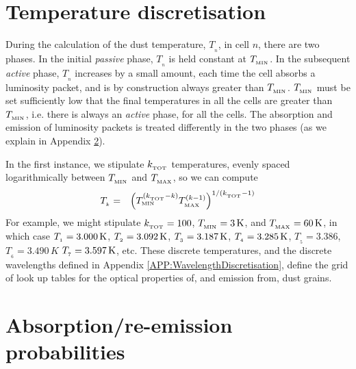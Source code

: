 \documentclass[usenatbib]{mn2e}
\numberwithin{equation}{section}
\begin{document}
\section{Temperature discretisation}

During the calculation of the dust temperature, $T_{_n}$, in cell $n$, there are two phases. In the initial {\it passive} phase, $T_{_n}$ is held constant at $T_{_{\rm MIN}}$. In the subsequent {\it active} phase, $T_{_n}$ increases by a small amount, each time the cell absorbs a luminosity packet, and is by construction always greater than $T_{_{\rm MIN}}$. $T_{_{\rm MIN}}$ must be set sufficiently low that the final temperatures in all the cells are greater than $T_{_{\rm MIN}}$, i.e. there is always an {\it active} phase, for all the cells. The absorption and emission of luminosity packets is treated differently in the two phases (as we explain in Appendix \ref{APP:abs-em}).

In the first instance, we stipulate $k_{_{\rm TOT}}$ temperatures, evenly spaced logarithmically between $T_{_{\rm MIN}}$ and $T_{_{\rm MAX}}$, so we can compute
\begin{eqnarray}
T_{_k}&=&\left(T_{_{\rm MIN}}^{(k_{_{\rm TOT}}-k)}T_{_{\rm MAX}}^{(k-1)}\right)^{1/(k_{_{\rm TOT}}-1)}
\end{eqnarray}
For example, we might stipulate $k_{_{\rm TOT}}=100$, $T_{_{\rm MIN}}=3\,{\rm K}$, and $T_{_{\rm MAX}}=60\,{\rm K}$, in which case $T_{_1}=3.000\,{\rm K}$, $T_{_2}=3.092\,{\rm K}$, $T_{_3}=3.187\,{\rm K}$, $T_{_4}=3.285\,{\rm K}$, $T_{_5}=3.386$, $T_{_6}=3.490\,K$ $T_{_7}=3.597\,{\rm K}$, etc. These discrete temperatures, and the discrete wavelengths defined in Appendix \ref{APP:WavelengthDiscretisation}, define the grid of look up tables for the optical properties of, and emission from, dust grains.





\section{Absorption/re-emission probabilities}\label{APP:abs-em}
\end{document}

